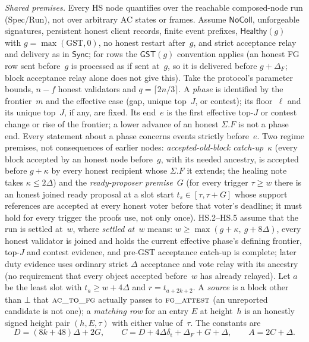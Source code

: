 \documentclass{article}
\newcommand{\fname}[1]{\text{\textsc{#1}}}
\begin{document}
\emph{Shared premises.}  Every HS node quantifies over the reachable
composed-node run (Spec/Run), not over arbitrary AC states or frames.  Assume
$\mathsf{NoColl}$, unforgeable signatures, persistent honest client records,
finite event prefixes, $\mathsf{Healthy}(g)$ with
$g=\max(\mathrm{GST},0)$, no honest restart after~$g$, and strict acceptance
relay and delivery as in $\mathsf{Sync}$; for rows the $\mathsf{GST}(g)$
convention applies (an honest FG row sent before~$g$ is processed as if sent
at~$g$, so it is delivered before $g+\Delta_F$; block acceptance relay alone
does not give this).  Take the protocol's parameter bounds, $n-f$ honest
validators and $q=\lceil 2n/3\rceil$.  A \emph{phase} is identified by the
frontier~$m$ and the effective case (gap, unique top~$J$, or contest); its
floor~$\ell$ and its unique top~$J$, if any, are fixed.  Its end~$e$ is the
first effective top-$J$ or contest change or rise of the frontier; a lower
advance of an honest $\Sigma.F$ is not a phase end.  Every statement about a
phase concerns events strictly before~$e$.
Two regime premises, not consequences of earlier nodes:
\emph{accepted-old-block catch-up}~$\kappa$ (every block accepted by an
honest node before~$g$, with its needed ancestry, is accepted before
$g+\kappa$ by every honest recipient whose $\Sigma.F$ it extends; the healing note
takes $\kappa\leq2\Delta$) and the \emph{ready-proposer premise}~$G$ (for every
trigger $\tau\geq w$ there is an honest joined ready proposal at a slot start
$t_s\in[\tau,\tau+G]$ whose support references are accepted at every honest
voter before that voter's deadline; it must hold for every trigger the proofs
use, not only once).
HS.2--HS.5 assume that the run is settled at~$w$, where \emph{settled
at~$w$} means: $w\geq\max(g+\kappa,\ g+8\Delta)$, every honest
validator is joined and holds the current effective phase's defining
frontier, top-$J$ and contest evidence, and pre-GST acceptance catch-up is
complete; later duty evidence uses ordinary strict $\Delta$ acceptance and
vote relay with its ancestry (no requirement that every object accepted
before~$w$ has already relayed).  Let $a$ be the least slot with
$t_a\geq w+4\Delta$ and $r=t_{a+2k+2}$.  A \emph{source} is a block other than
$\bot$ that $\fname{ac\_to\_fg}$ actually passes to $\fname{fg\_attest}$ (an
unreported candidate is not one); a \emph{matching row} for an entry $E$ at
height~$h$ is an honestly signed height pair $(h,E,\tau)$ with either
value of~$\tau$.  The constants are
\[
D=(8k+48)\Delta+2G,\qquad C=D+4\Delta\delta_{\mathrm t}+\Delta_F+G+\Delta,\qquad
A=2C+\Delta .
\]
\end{document}
